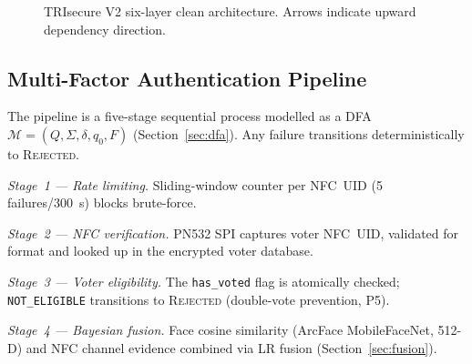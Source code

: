 \documentclass[conference]{IEEEtran}
\begin{document}
\begin{figure}[t]
\centering
{}
\caption{TRIsecure V2 six-layer clean architecture. Arrows indicate upward
  dependency direction.}
\label{fig:architecture}
\end{figure}

\subsection{Multi-Factor Authentication Pipeline}
\label{sec:pipeline}

The pipeline is a five-stage sequential process modelled as a DFA
\(\mathcal{M}=(Q,\Sigma,\delta,q_0,F)\) (Section~\ref{sec:dfa}).
Any failure transitions deterministically to \textsc{Rejected}.

\textit{Stage~1 — Rate limiting.} Sliding-window counter per NFC~UID
(5 failures/300~s) blocks brute-force.

\textit{Stage~2 — NFC verification.} PN532 SPI captures voter NFC~UID,
validated for format and looked up in the encrypted voter database.

\textit{Stage~3 — Voter eligibility.} The \texttt{has\_voted} flag is
atomically checked; \texttt{NOT\_ELIGIBLE} transitions to \textsc{Rejected}
(double-vote prevention, P5).

\textit{Stage~4 — Bayesian fusion.} Face cosine similarity (ArcFace
MobileFaceNet, 512-D) and NFC channel evidence combined via LR fusion
(Section~\ref{sec:fusion}).
\end{document}

